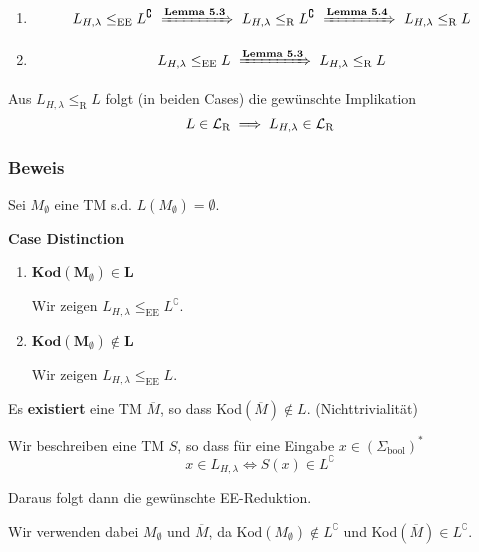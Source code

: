         \begin{enumerate}[label=\arabic*.]
            \item $$L_{H, \lambda} \leq_{\text{EE}} L^\complement \ \xRightarrow{\textbf{Lemma 5.3}} \ L_{H,\lambda} \leq_{\text{R}} L^\complement \ \xRightarrow{\textbf{Lemma 5.4}} \ L_{H,\lambda} \leq_{\text{R}} L$$
            \item $$L_{H, \lambda} \leq_{\text{EE}} L \ \xRightarrow{\textbf{Lemma 5.3}} \ L_{H,\lambda} \leq_{\text{R}} L$$
        \end{enumerate}
    
        
        Aus $L_{H,\lambda} \leq_{\text{R}} L$ folgt (in beiden Cases) die gewünschte Implikation  
        $$L \in \mathcal{L}_\text{R} \implies L_{H, \lambda} \in \mathcal{L}_\text{R}$$
    
    
    
        \subsubsection{Beweis}
        Sei $M_{\emptyset}$ eine TM s.d. $L(M_{\emptyset}) = \emptyset$. 
    
        \textbf{Case Distinction}
        \begin{enumerate}[label=\Roman*.]
            \item $\mathbf{\textbf{Kod}(M_{\emptyset}) \in L}$
            
            Wir zeigen $L_{H, \lambda} \leq_{\text{EE}} L^\complement$.
            \item $\mathbf{\textbf{Kod}(M_{\emptyset}) \notin L}$
            
            Wir zeigen $L_{H, \lambda} \leq_{\text{EE}} L$.
        \end{enumerate}
    
    
    
        
        Es \textbf{existiert} eine TM $\overline{M}$, so dass Kod$(\overline{M}) \notin L$. (Nichttrivialität)
    
        
        Wir beschreiben eine TM $S$, so dass für eine Eingabe $x \in (\Sigma_{\text{bool}})^*$
        $$x \in L_{H, \lambda} \iff S(x) \in L^\complement$$
    
        Daraus folgt dann die gewünschte EE-Reduktion.
    
        
        Wir verwenden dabei $M_{\emptyset}$ und $\overline{M}$, da $\text{Kod}(M_{\emptyset}) \notin L^\complement$ und Kod$(\overline{M}) \in L^\complement$.
    
